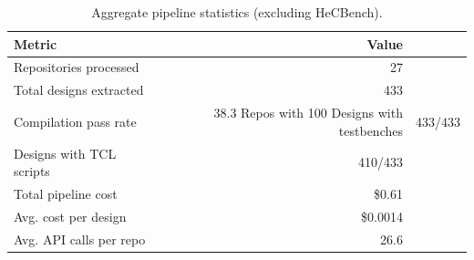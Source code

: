 \begin{table}[t]
\centering
\caption{Aggregate pipeline statistics (excluding HeCBench).}
\label{tab:summary}
\begin{tabular}{lr}
\toprule
\textbf{Metric} & \textbf{Value} \\
\midrule
Repositories processed & 27 \\
Total designs extracted & 433 \\
Compilation pass rate & 38.3%
Repos with 100%
Designs with testbenches & 433/433 \\
Designs with TCL scripts & 410/433 \\
Total pipeline cost & \$0.61 \\
Avg. cost per design & \$0.0014 \\
Avg. API calls per repo & 26.6 \\
\bottomrule
\end{tabular}
\end{table}